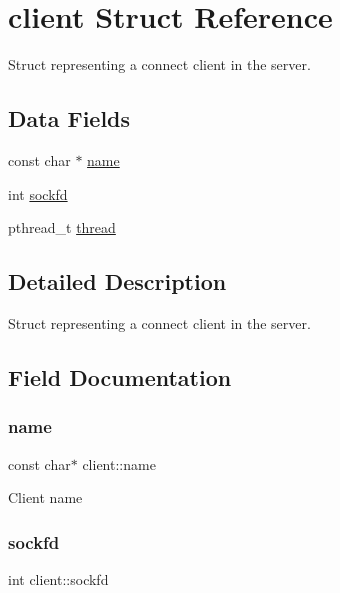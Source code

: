 \hypertarget{structclient}{}\section{client Struct Reference}
\label{structclient}


Struct representing a connect client in the server.  


\subsection*{Data Fields}
\begin{DoxyCompactItemize}
\item 
const char $\ast$ \hyperlink{structclient_a99f435ea140a038c3be5e2ab49aa43aa}{name}
\item 
int \hyperlink{structclient_ab7c05dd7a1a5daa5383849d8b3b0ce3f}{sockfd}
\item 
pthread\+\_\+t \hyperlink{structclient_a529fa20e309347262616a00ad0ad3d93}{thread}
\end{DoxyCompactItemize}


\subsection{Detailed Description}
Struct representing a connect client in the server. 

\subsection{Field Documentation}
\mbox{\label{structclient_a99f435ea140a038c3be5e2ab49aa43aa}} 
\subsubsection{\texorpdfstring{name}{name}}
{\footnotesize\ttfamily const char$\ast$ client\+::name}

Client name \mbox{\label{structclient_ab7c05dd7a1a5daa5383849d8b3b0ce3f}} 
\subsubsection{\texorpdfstring{sockfd}{sockfd}}
{\footnotesize\ttfamily int client\+::sockfd}

